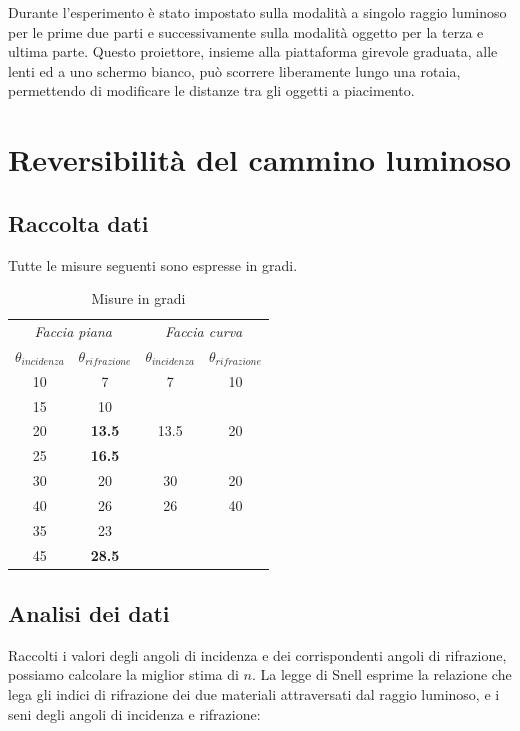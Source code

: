 \documentclass[a4paper,10pt]{report}
\begin{document}
Durante l'esperimento è stato impostato sulla modalità a singolo raggio luminoso per le prime due parti e successivamente sulla modalità oggetto per la terza e ultima parte. 
Questo proiettore, insieme alla piattaforma girevole graduata, alle lenti ed a uno schermo bianco, può scorrere liberamente lungo una rotaia, permettendo di modificare le distanze tra gli oggetti a piacimento.

\section{Reversibilità del cammino luminoso}
\subsection{Raccolta dati}
Tutte le misure seguenti sono espresse in gradi.\\


\begin{table}
\center
\begin{tabular}{c|c||c|c}
 \multicolumn{2}{c}{\textit{Faccia piana}} &
\multicolumn{2}{c}{\textit{Faccia curva}} \\
$\theta_{incidenza} $ & $\theta_{rifrazione} $ &$\theta_{incidenza} $ & $\theta_{rifrazione} $\\
\midrule
 10 & 7 & 7 & 10 \\
15 & 10 & &\\
20 & \textbf{13.5} & 13.5 & 20\\ 
25 & \textbf{16.5} & & \\
30 & 20 & 30 & 20\\
40 & 26 & 26 & 40\\
35 & 23 & &\\
45&  \textbf{28.5} & & \\
\end{tabular}
\caption*{Misure in gradi}
\end{table}

\subsection{Analisi dei dati}
Raccolti i valori degli angoli di incidenza e dei corrispondenti angoli di rifrazione, possiamo calcolare la miglior stima di $n$. 
La legge di Snell esprime la relazione che lega gli indici di rifrazione dei due materiali attraversati dal raggio luminoso, e i seni degli angoli di incidenza e rifrazione:\\
\end{document}
